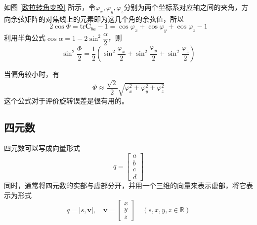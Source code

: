 \sssection[欧拉转角的几何意义]

如图 \ref{欧拉转角变换} 所示，令$\varphi_x, \varphi_y, \varphi_z$分别为两个坐标系对应轴之间的夹角，方向余弦矩阵的对焦线上的元素即为这几个角的余弦值，所以
\begin{equation}
	2 \cos \varPhi = \text{tr} \bm{C}_{ba} - 1 = \cos \varphi_x + \cos \varphi_y + \cos \varphi_z - 1
\end{equation}
利用半角公式$\cos \alpha = 1 - 2 \sin^2 \dfrac{\alpha}{2}$，则
\begin{equation}
	\sin^2 \dfrac{\varPhi}{2} = \dfrac{1}{2} \left( \sin^2 \dfrac{\varphi_x}{2} + \sin^2 \dfrac{\varphi_y}{2} + \sin^2 \dfrac{\varphi_z}{2} \right)
\end{equation}

当偏角较小时，有
\begin{equation}
	\varPhi \approx \dfrac{\sqrt{2}}{2} \sqrt{\varphi_x^2 + \varphi_y^2 + \varphi_z^2}
\end{equation}
这个公式对于评价旋转误差是很有用的。




\subsection{四元数}


四元数可以写成向量形式
\begin{equation}
	q = 
	\begin{bmatrix}
		a \\
		b \\
		c \\
		d
	\end{bmatrix}
\end{equation}
同时，通常将四元数的实部与虚部分开，并用一个三维的向量来表示虚部，将它表示为形式
\begin{equation}
	q = \big[ s, \bm{v} \big],
	\quad 
	\bm{v} = 
	\begin{bmatrix}
		x \\
		y \\
		z
	\end{bmatrix} 
	\quad (s,x,y,z \in \mathbb{R})
\end{equation}


